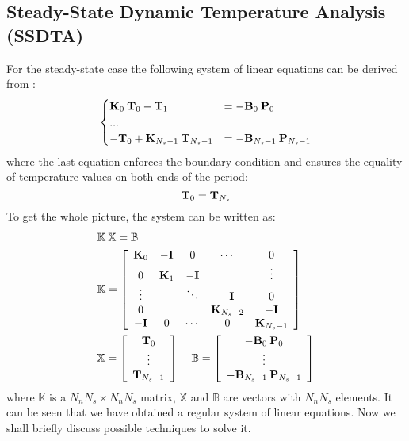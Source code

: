 \subsection{Steady-State Dynamic Temperature Analysis (SSDTA)} \label{sec:ssdta-analytical}
For the steady-state case the following system of linear equations can be derived from :
\[
  \begin{cases}
    \mathbf{K}_0 \: \mathbf{T}_0 - \mathbf{T}_1 & = -\mathbf{B}_0 \: \mathbf{P}_0 \\
    ... \\
    -\mathbf{T}_0 + \mathbf{K}_{N_s - 1} \: \mathbf{T}_{N_s - 1} & = -\mathbf{B}_{N_s - 1} \: \mathbf{P}_{N_s - 1}
  \end{cases}
\]
where the last equation enforces the boundary condition and ensures the equality of temperature values on both ends of the period:
\begin{equation} \label{eq:boundary-condition}
  \mathbf{T}_0 = \mathbf{T}_{N_s}
\end{equation}
To get the whole picture, the system can be written as:
\begin{align}
  & \mathbb{K} \: \mathbb{X} = \mathbb{B} \label{eq:system} \\
  & \mathbb{K} = \left[
    \begin{array}{ccccc}
      \mathbf{K}_0 & -\mathbf{I} & 0 & \cdots & 0 \\
      0 & \mathbf{K}_1 & -\mathbf{I} &  & \vdots \\
      \vdots &  & \ddots & -\mathbf{I} & 0 \\
      0 &  &  & \mathbf{K}_{N_s - 2} & -\mathbf{I} \\
      -\mathbf{I} & 0 & \cdots & 0 & \mathbf{K}_{N_s - 1}
    \end{array}
  \right] \nonumber \\
  & \mathbb{X} = \left[
    \begin{array}{c}
      \mathbf{T}_0 \\
      \vdots \\
      \mathbf{T}_{N_s - 1}
    \end{array}
  \right] \; \; \; \; \mathbb{B} = \left[
    \begin{array}{c}
      -\mathbf{B}_0 \: \mathbf{P}_0 \\
      \vdots \\
      -\mathbf{B}_{N_s - 1} \: \mathbf{P}_{N_s - 1}
    \end{array}
  \right] \nonumber
\end{align}
where $\mathbb{K}$ is a $N_n N_s \times N_n N_s$ matrix, $\mathbb{X}$ and $\mathbb{B}$ are vectors with $N_n N_s$ elements. It can be seen that we have obtained a regular system of linear equations. Now we shall briefly discuss possible techniques to solve it.






